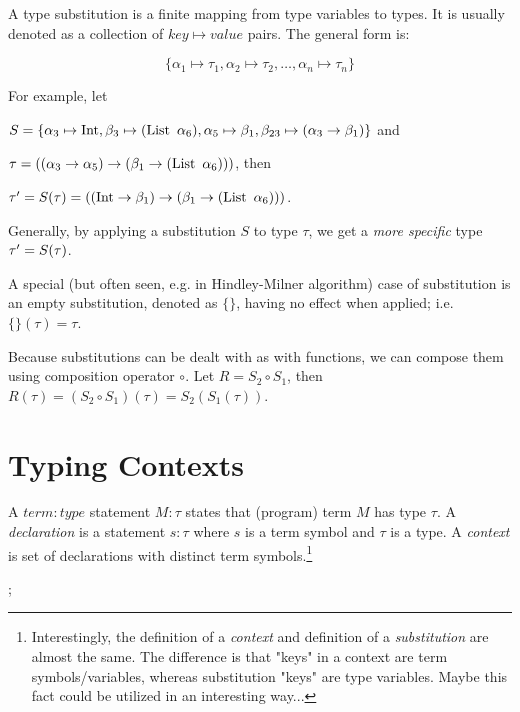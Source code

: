 \documentclass[a4paper,oneside]{memoir}
\begin{document}
A type substitution is a finite mapping from type variables to types.
It is usually denoted as a collection of $key \mapsto value$ pairs.
The general form is:

$$\{ \alpha_1 \mapsto \tau_1, \alpha_2 \mapsto \tau_2, \dots, \alpha_n \mapsto \tau_n \}$$ 

For example, let 

$S = \{ \alpha_3 \mapsto \operatorname{Int}, 
\beta_3 \mapsto (\operatorname{List}~\alpha_6),
\alpha_5 \mapsto \beta_1, 
\beta_{23} \mapsto (\alpha_3 \rightarrow \beta_1) \}$ 
and 

$\tau = ((\alpha_3 \rightarrow \alpha_5) \rightarrow ( \beta_1  \rightarrow (\operatorname{List}~\alpha_6) ) )$,
then 

$\tau^\prime = S(\tau) = ((\operatorname{Int} \rightarrow \beta_1) \rightarrow (\beta_1  \rightarrow (\operatorname{List}~\alpha_6) ) )$.

Generally, by applying a substitution $S$ to type $\tau$, we get a \textit{more specific} type $\tau^\prime = S(\tau)$.

A special (but often seen, e.g. in Hindley-Milner algorithm) case of substitution is an
empty substitution, denoted as $\{\}$, having no effect when applied; 
i.e. $\{\}(\tau) = \tau$.


Because substitutions can be dealt with as with functions, we can compose them using composition operator $\circ$. Let $R = S_2 \circ S_1$, then 
$R(\tau) = (S_2 \circ S_1)(\tau) = S_2 ( S_1(\tau) )$. 



\section{Typing Contexts}

\begin{definition}
A $\mathit{term:type}$ statement $\mathit{M}:\mathit{\tau}$ states that (program) term $M$ has type $\tau$.   
A \textit{declaration} is a statement $s : \tau$ where $s$ is a term symbol and $\tau$ is a type.
A \textit{context} is set of declarations with distinct term symbols.\footnote{Interestingly, the definition of a \textit{context} and definition of a \textit{substitution} are almost the same. The difference is that "keys" in a context are term symbols/variables, whereas substitution "keys" are type variables. Maybe this fact could be utilized in an interesting way...}
\end{definition}

 ; 
\end{document}
